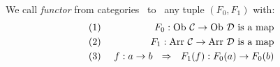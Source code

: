 \begin{defin}\label{Fun:def:functor}
    We call {\em functor} from categories \Cat\ to \Dat\ any tuple 
    $(F_{0},F_{1})$ with:
        \begin{eqnarray*}
            (1)&\ &F_{0}:\ob\ \Cat\to\ob\ \Dat\mbox{\ is a map}\\
            (2)&\ &F_{1}:\arr\ \Cat\to\arr\ \Dat\mbox{\ is a map}\\
            (3)&\ & f:a\to b\ \ \Rightarrow\ \ F_{1}(f):F_{0}(a)\to F_{0}(b)
    \end{eqnarray*}
\end{defin}

